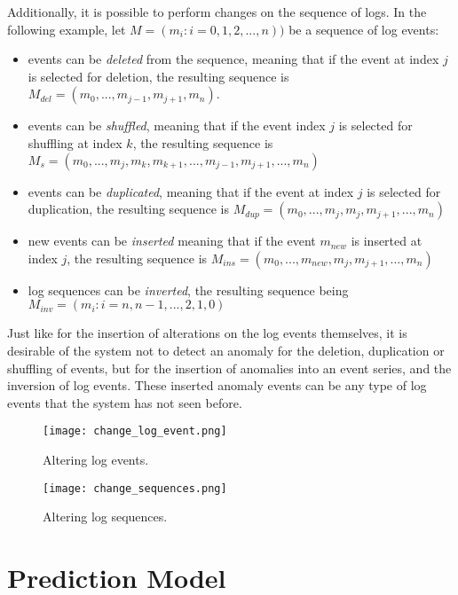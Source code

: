 Additionally, it is possible to perform changes on the sequence of logs. In the following example, let $M = (m_i : i = 0, 1, 2, ..., n))$ be a sequence of log events:
\begin{itemize}
	\setlength\itemsep{-0.5em}
	\item events can be \textit{deleted} from the sequence, meaning that if the event at index $j$ is selected for deletion, the resulting sequence is $M_{del} = (m_0, ..., m_{j-1}, m_{j+1}, m_n)$.
	\item events can be \textit{shuffled}, meaning that if the event index $j$ is selected for shuffling at index $k$, the resulting sequence is $M_s = (m_0, ..., m_j, m_k, m_{k+1}, ..., m_{j-1}, m_{j+1}, ..., m_n)$
	\item events can be \textit{duplicated}, meaning that if the event at index $j$ is selected for duplication, the resulting sequence is $M_{dup} = (m_0, ..., m_j, m_j, m_{j+1}, ..., m_n)$
	\item new events can be \textit{inserted} meaning that if the event $m_{new}$ is inserted at index $j$, the resulting sequence is $M_{ins} = (m_0, ..., m_{new}, m_j, m_{j+1}, ..., m_n)$
	\item log sequences can be \textit{inverted}, the resulting sequence being $M_{inv} = (m_i : i = n, n-1, ..., 2, 1, 0)$
\end{itemize}

Just like for the insertion of alterations on the log events themselves, it is desirable of the system not to detect an anomaly for the deletion, duplication or shuffling of events, but for the insertion of anomalies into an event series, and the inversion of log events. These inserted anomaly events can be any type of log events that the system has not seen before.


\begin{figure}[H]
	\centering
	\texttt{[image: change\_log\_event.png]}
	\caption{Altering log events.}
	\label{fig:changelogevent}
\end{figure}

\begin{figure}[H]
	\centering
	\texttt{[image: change\_sequences.png]}
	\caption{Altering log sequences.}
	\label{fig:changesequence}
\end{figure}




\section{Prediction Model\label{sec:prediction_model}}

